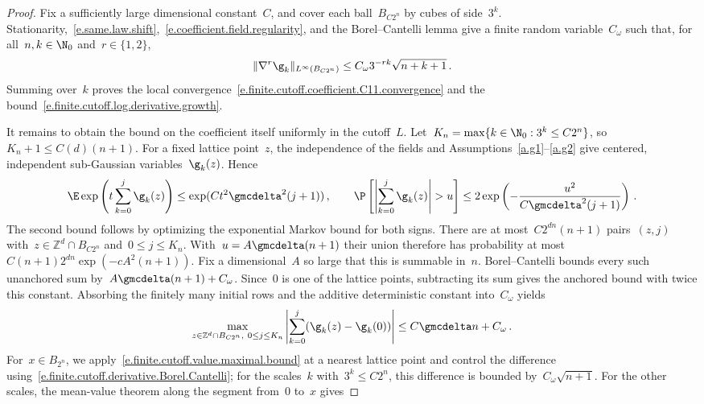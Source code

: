 \documentclass[11pt]{amsart}
\begin{document}
\begin{proof}
	Fix a sufficiently large dimensional constant~$C$, and cover each ball~$B_{C2^n}$ by cubes of side~$3^k$. Stationarity,~\eqref{e.same.law.shift},~\eqref{e.coefficient.field.regularity}, and the Borel--Cantelli lemma give a finite random variable~$C_\omega$ such that, for all~$n,k\in\N_0$ and~$r\in\{1,2\}$,
	\begin{equation}
		\|\nabla^r\g_k\|_{L^\infty(B_{C2^n})}
		\leq
		C_\omega3^{-rk}\sqrt{n+k+1}\,.
		\label{e.finite.cutoff.derivative.Borel.Cantelli}
	\end{equation}
	Summing over~$k$ proves the local convergence~\eqref{e.finite.cutoff.coefficient.C11.convergence} and the bound~\eqref{e.finite.cutoff.log.derivative.growth}.

\smallskip

    It remains to obtain the bound on the coefficient itself uniformly in the cutoff~$L$. Let~$K_n=\max\{k\in\N_0:3^k\leq C2^n\}$, so~$K_n+1\leq C(d)(n+1)$. For a fixed lattice point~$z$, the independence of the fields and Assumptions~\ref{a.g1}--\ref{a.g2} give centered, independent sub-Gaussian variables~$\g_k(z)$. Hence
\begin{equation*}
	\E\exp\left(t\sum_{k=0}^j\g_k(z)\right)
	\leq\exp(Ct^2\gmcdelta^2(j+1))\,,
	\qquad
	\P\left[\left|\sum_{k=0}^j\g_k(z)\right|>u\right]
	\leq2\exp\left(-\frac{u^2}{C\gmcdelta^2(j+1)}\right)\,.
\end{equation*}
The second bound follows by optimizing the exponential Markov bound for both signs. There are at most~$C2^{dn}(n+1)$ pairs~$(z,j)$ with~$z\in\mathbb Z^d\cap B_{C2^n}$ and~$0\leq j\leq K_n$. With~$u=A\gmcdelta(n+1)$ their union therefore has probability at most~$C(n+1)2^{dn}\exp(-cA^2(n+1))$. Fix a dimensional~$A$ so large that this is summable in~$n$. Borel--Cantelli bounds every such unanchored sum by~$A\gmcdelta(n+1)+C_\omega$. Since~$0$ is one of the lattice points, subtracting its sum gives the anchored bound with twice this constant. Absorbing the finitely many initial rows and the additive deterministic constant into~$C_\omega$ yields
	\begin{equation}
		\max_{z\in\mathbb Z^d\cap B_{C2^n},\ 0\leq j\leq K_n}
		\left|
		\sum_{k=0}^j(\g_k(z)-\g_k(0))
		\right|
		\leq
		C\gmcdelta n+C_\omega\,.
		\label{e.finite.cutoff.value.maximal.bound}
	\end{equation}
	For~$x\in B_{2^n}$, we apply~\eqref{e.finite.cutoff.value.maximal.bound} at a nearest lattice point and control the difference using~\eqref{e.finite.cutoff.derivative.Borel.Cantelli}; for the scales~$k$ with~$3^k\leq C2^n$, this difference is bounded by~$C_\omega\sqrt{n+1}$. For the other scales, the mean-value theorem along the segment from~$0$ to~$x$ gives

\end{proof}
\end{document}
